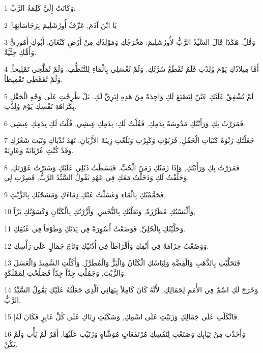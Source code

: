 \par 1 وَكَانَتْ إِلَيَّ كَلِمَةُ الرَّبِّ:
\par 2 [يَا ابْنَ آدَمَ, عَرِّفْ أُورُشَلِيمَ بِرَجَاسَاتِهَا
\par 3 وَقُلْ: هَكَذَا قَالَ السَّيِّدُ الرَّبُّ لأُورُشَلِيمَ: مَخْرَجُكِ وَمَوْلِدُكِ مِنْ أَرْضِ كَنْعَانَ. أَبُوكِ أَمُورِيٌّ وَأُمُّكِ حِثِّيَّةٌ.
\par 4 أَمَّا مِيلاَدُكِ يَوْمَ وُلِدْتِ فَلَمْ تُقْطَعْ سُرَّتُكِ, وَلَمْ تُغْسَلِي بِالْمَاءِ لِلتَّنَظُّفِ, وَلَمْ تُمَلَّحِي تَمْلِيحاً, وَلَمْ تُقَمَّطِي تَقْمِيطاً.
\par 5 لَمْ تُشْفِقْ عَلَيْكِ عَيْنٌ لِتَصْنَعَ لَكِ وَاحِدَةً مِنْ هَذِهِ لِتَرِقَّ لَكِ. بَلْ طُرِحْتِ عَلَى وَجْهِ الْحَقْلِ بِكَرَاهَةِ نَفْسِكِ يَوْمَ وُلِدْتِ.
\par 6 فَمَرَرْتُ بِكِ وَرَأَيْتُكِ مَدُوسَةً بِدَمِكِ, فَقُلْتُ لَكِ: بِدَمِكِ عِيشِي. قُلْتُ لَكِ بِدَمِكِ عِيشِي.
\par 7 جَعَلْتُكِ رَبْوَةً كَنَبَاتِ الْحَقْلِ, فَرَبَوْتِ وَكَبِرْتِ وَبَلَغْتِ زِينَةَ الأَزْيَانِ. نَهَدَ ثَدْيَاكِ وَنَبَتَ شَعْرُكِ وَقَدْ كُنْتِ عُرْيَانَةً وَعَارِيَةً.
\par 8 فَمَرَرْتُ بِكِ وَرَأَيْتُكِ, وَإِذَا زَمَنُكِ زَمَنُ الْحُبِّ. فَبَسَطْتُ ذَيْلِي عَلَيْكِ وَسَتَرْتُ عَوْرَتَكِ, وَحَلَفْتُ لَكِ وَدَخَلْتُ مَعَكِ فِي عَهْدٍ يَقُولُ السَّيِّدُ الرَّبُّ, فَصِرْتِ لِي.
\par 9 فَحَمَّمْتُكِ بِالْمَاءِ وَغَسَلْتُ عَنْكِ دِمَاءَكِ وَمَسَحْتُكِ بِالزَّيْتِ,
\par 10 وَأَلْبَسْتُكِ مُطَرَّزَةً, وَنَعَلْتُكِ بِالتُّخَسِ, وَأَزَّرْتُكِ بِالْكَتَّانِ وَكَسَوْتُكِ بَزّاً,
\par 11 وَحَلَّيْتُكِ بِالْحُلِيِّ, فَوَضَعْتُ أَسْوِرَةً فِي يَدَيْكِ وَطَوْقاً فِي عُنُقِكِ.
\par 12 وَوَضَعْتُ خِزَامَةً فِي أَنْفِكِ وَأَقْرَاطاً فِي أُذُنَيْكِ وَتَاجَ جَمَالٍ عَلَى رَأْسِكِ.
\par 13 فَتَحَلَّيْتِ بِالذَّهَبِ وَالْفِضَّةِ وَلِبَاسُكِ الْكَتَّانُ وَالْبَزُّ وَالْمُطَرَّزُ. وَأَكَلْتِ السَّمِيذَ وَالْعَسَلَ وَالزَّيْتَ, وَجَمُلْتِ جِدّاً جِدّاً فَصَلُحْتِ لِمَمْلَكَةٍ.
\par 14 وَخَرَجَ لَكِ اسْمٌ فِي الأُمَمِ لِجَمَالِكِ, لأَنَّهُ كَانَ كَامِلاً بِبَهَائِي الَّذِي جَعَلْتُهُ عَلَيْكِ يَقُولُ السَّيِّدُ الرَّبُّ.
\par 15 [فَاتَّكَلْتِ عَلَى جَمَالِكِ وَزَنَيْتِ عَلَى اسْمِكِ, وَسَكَبْتِ زِنَاكِ عَلَى كُلِّ عَابِرٍ فَكَانَ لَهُ.
\par 16 وَأَخَذْتِ مِنْ ثِيَابِكِ وَصَنَعْتِ لِنَفْسِكِ مُرْتَفَعَاتٍ مُوَشَّاةٍ وَزَنَيْتِ عَلَيْهَا. أَمْرٌ لَمْ يَأْتِ وَلَمْ يَكُنْ.
